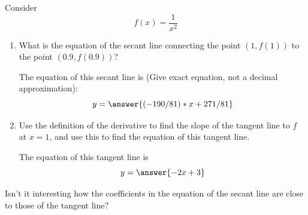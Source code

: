 \documentclass{ximera}
\author{Steven Gubkin \and Bobby Ramsey}
\begin{document}
\begin{exercise}

Consider
\[
f(x) = \frac{1}{x^2}
\]



\begin{enumerate}
\item What is the equation of the secant line connecting the point $(1,f(1))$ to the point $(0.9,f(0.9))$?
\begin{prompt}
The equation of this secant line is (Give exact equation, not a decimal approximation):
\[ y = \answer{(-190/81)*x + 271/81}\]
\end{prompt}

\item  Use the definition of the derivative to find the slope of the tangent line to $f$ at $x=1$, and use this to find the equation of this tangent line.

\begin{prompt}
The equation of this tangent line is
\[y = \answer{ -2x + 3}\]
\end{prompt}

\end{enumerate}

Isn't it interesting how the coefficients in the equation of the secant line are close to those of the tangent line?
\end{exercise}
\end{document}
